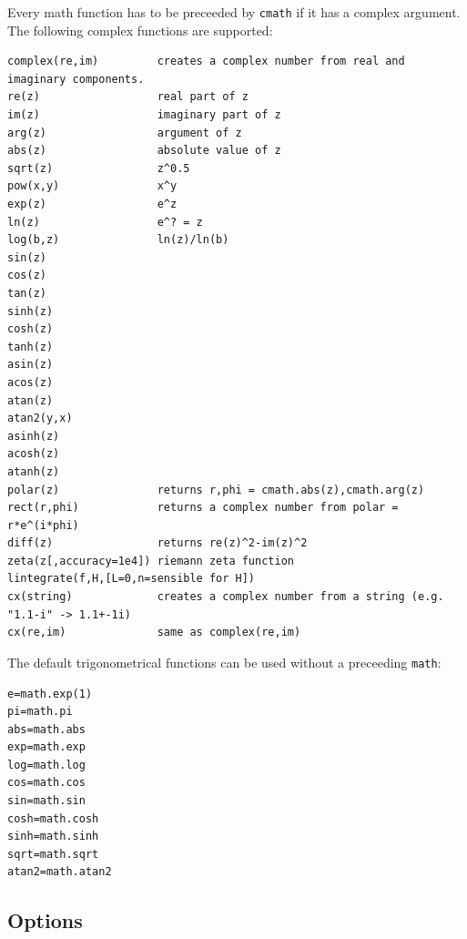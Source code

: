 \documentclass[fontsize=11pt,english,BCOR=10mm,DIV=12,bibliography=totoc,parskip=false,headings=small,
    headinclude=false,footinclude=false,oneside]{pst-doc}
\begin{document}
Every math function has to be preceeded by \texttt{cmath} if it has a complex argument.
The following complex functions are supported:

\begin{verbatim}
complex(re,im)         creates a complex number from real and imaginary components.
re(z)                  real part of z
im(z)                  imaginary part of z
arg(z)                 argument of z
abs(z)                 absolute value of z
sqrt(z)                z^0.5
pow(x,y)               x^y
exp(z)                 e^z
ln(z)                  e^? = z
log(b,z)               ln(z)/ln(b)
sin(z)
cos(z)
tan(z)
sinh(z)
cosh(z)
tanh(z)
asin(z)
acos(z)
atan(z)
atan2(y,x)
asinh(z)
acosh(z)
atanh(z)
polar(z)               returns r,phi = cmath.abs(z),cmath.arg(z)
rect(r,phi)            returns a complex number from polar = r*e^(i*phi)
diff(z)                returns re(z)^2-im(z)^2
zeta(z[,accuracy=1e4]) riemann zeta function
lintegrate(f,H,[L=0,n=sensible for H])
cx(string)             creates a complex number from a string (e.g. "1.1-i" -> 1.1+-1i)
cx(re,im)              same as complex(re,im)
\end{verbatim}

The default trigonometrical functions can be used without a preceeding \verb|math|: 

\begin{verbatim}
e=math.exp(1)
pi=math.pi
abs=math.abs
exp=math.exp
log=math.log
cos=math.cos
sin=math.sin
cosh=math.cosh
sinh=math.sinh
sqrt=math.sqrt
atan2=math.atan2
\end{verbatim}



\subsection{Options}
\end{document}
